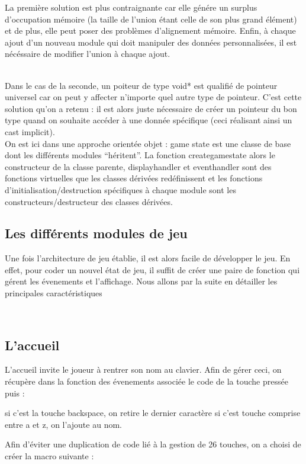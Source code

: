 La première solution est plus contraignante car elle génére un surplus
d'occupation mémoire (la taille de l'union étant celle de son plus
grand élément) et de plus, elle peut poser des problèmes d'alignement
mémoire. Enfin, à chaque ajout d'un nouveau module qui doit manipuler
des données personnalisées, il est nécéssaire de modifier l'union à
chaque ajout.

~\\
Dans le cas de la seconde, un poiteur de type void* est qualifié de
pointeur  universel car on peut y affecter n'importe quel autre type
de  pointeur. C'est cette solution qu'on a retenu :  il est alors
juste  nécessaire de créer un pointeur du bon type quand on souhaite
accéder à une donnée spécifique (ceci réalisant ainsi un cast implicit).
~\\

On est ici dans une approche orientée objet : game\textunderscore
state est une classe de base dont les différents modules ``héritent''.
La fonction create\textunderscore game\textunderscore state alors le
constructeur de la classe parente,  display\textunderscore handler et
event\textunderscore handler sont des fonctions virtuelles que les
classes dérivées redéfinissent et les fonctions d'initialisation/destruction
spécifiques à chaque module sont les constructeurs/destructeur des classes
dérivées.


\subsection{Les différents modules de jeu}
Une fois l'architecture de jeu établie, il est alors facile de
développer le jeu. En effet, pour coder un nouvel état de jeu, il
suffit de créer une paire de fonction qui gérent les évenements et
l'affichage. Nous allons par la suite en détailler les principales caractéristiques

~\\

\subsection{L'accueil}
L'accueil invite le joueur à rentrer son nom au clavier.
Afin de gérer ceci, on récupère dans la fonction des évenements
associée le code de la touche pressée puis :

si c'est la touche backspace, on retire le dernier caractère
si c'est touche comprise entre a et z, on l'ajoute au nom.

Afin d'éviter une duplication de code lié à la gestion de 26 touches,
on a choisi de créer la macro suivante :

